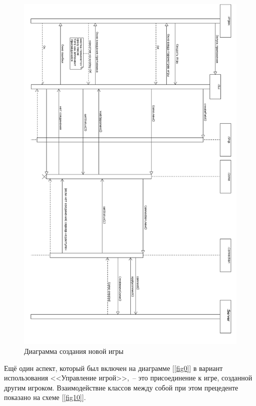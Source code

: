 \begin{figure}[pt]
\centering
\includegraphics[width=15cm]{images/CRG.png}
\caption{Диаграмма создания новой игры}
\label{fig9}
\end{figure}


Ещё один аспект, который был включен на диаграмме [\ref{fig0}] в вариант использования <<Управление игрой>>,~-- это присоединение к игре, созданной другим игроком. Взаимодействие классов между собой при этом прецеденте показано на схеме [\ref{fig10}].

